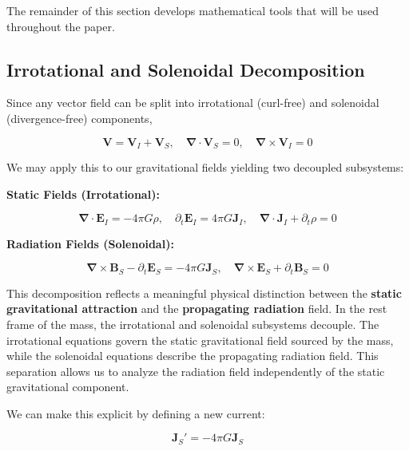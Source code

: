 \documentclass {article}
\renewcommand\vec{\mathbf}
\let\OldS\nabla
\renewcommand{\nabla}{\boldsymbol{\OldS}}
\begin{document}
The remainder of this section develops mathematical tools that will be used throughout the paper.



\subsection{Irrotational and Solenoidal Decomposition}
\label{subsec:decomp}

Since any vector field can be split into irrotational (curl-free) and solenoidal (divergence-free) components,

\begin{equation}
\vec{V} = \vec{V}_I + \vec{V}_S, \quad 
\nabla \cdot \vec{V}_S = 0, \quad 
\nabla \times \vec{V}_I = 0
\end{equation}

We may apply this to our gravitational fields yielding two decoupled subsystems:

\vspace{0.5em}
\noindent\textbf{Static Fields (Irrotational):}

\begin{equation}
\nabla \cdot \vec{E}_I = -4 \pi G \rho, \quad 
\partial_t \vec{E}_I = 4 \pi G \vec{J}_I, \quad 
\nabla \cdot \vec{J}_I + \partial_t \rho = 0
\end{equation}

\noindent\textbf{Radiation Fields (Solenoidal):}


\begin{equation}
\nabla \times \vec{B}_S - \partial_t \vec{E}_S = -4 \pi G \vec{J}_S, \quad 
\nabla \times \vec{E}_S + \partial_t \vec{B}_S = 0
\end{equation}



This decomposition reflects a meaningful physical distinction between the \textbf{static gravitational attraction} and the \textbf{propagating radiation} field. In the rest frame of the mass, the irrotational and solenoidal subsystems decouple. The irrotational equations govern the static gravitational field sourced by the mass, while the solenoidal equations describe the propagating radiation field. This separation allows us to analyze the radiation field independently of the static gravitational component.

We can make this explicit by defining a new current:


\begin{equation}
\vec{J}_S' = -4 \pi G \vec{J}_S
\end{equation}
\end{document}
